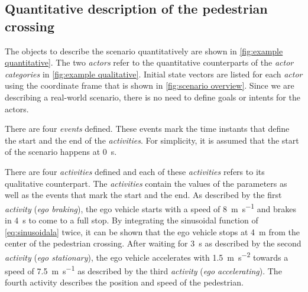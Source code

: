 \subsection{Quantitative description of the pedestrian crossing}
\label{sec:example quantitative}

The objects to describe the scenario quantitatively are shown in \cref{fig:example quantitative}. The two \textit{actors} refer to the quantitative counterparts of the \textit{actor categories} in \cref{fig:example qualitative}. Initial state vectors are listed for each \textit{actor} using the coordinate frame that is shown in \cref{fig:scenario overview}. 
Since we are describing a real-world scenario, there is no need to define \cstarte goals or intents \cende for the actors.


\begin{figure*}[t]
	\centering
	
	\caption{The objects that are used to quantitatively describe the scenario that is schematically shown in \cref{fig:scenario overview}. For the sake of brevity, the tags and the unique ID of each object are omitted.}
	\label{fig:example quantitative}
\end{figure*}

\cstartb There are four \textit{events} defined. These events mark the time instants that define the start and the end of the \textit{activities}. For simplicity, it is assumed that the start of the scenario happens at \SI{0}{\second}. \cendb

There are four \textit{activities} defined and each of these \textit{activities} refers to its qualitative counterpart.
The \textit{activities} contain the values of the parameters as well as \cstartb the events that mark the start and the end\cendb. 
As described by the first \textit{activity} (\emph{ego braking}), the ego vehicle starts with a speed of \SI{8}{\meter\per\second} and brakes in \SI{4}{\second} to come to a full stop. By integrating the sinusoidal function of \cref{eq:sinusoidala} twice, it can be shown that the ego vehicle stops at \SI{4}{\meter} from the center of the pedestrian crossing. 
After waiting for \SI{3}{\second} \cstarte as described by \cende the second \textit{activity} (\emph{ego stationary}), the ego vehicle accelerates with \SI{1.5}{\meter\per\second\squared} towards a speed of \SI{7.5}{\meter\per\second} \cstarte as described by \cende the third \textit{activity} (\emph{ego accelerating}). 
The fourth activity describes the position \cstarte and speed \cende of the pedestrian.


